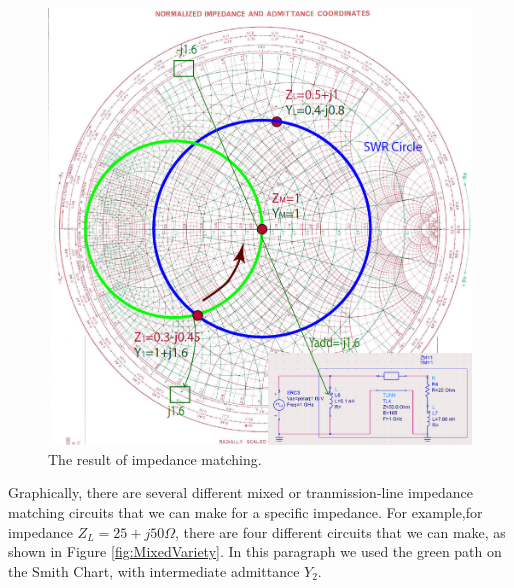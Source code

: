 \documentclass{ximera}
\begin{document}
\begin{figure}[htbp]
\begin{center}
\includegraphics[scale=0.4]{../jpg/MatchMixed1.jpg}
\end{center}
\caption{The result of impedance matching.}
\label{impmatchgen}
\end{figure}
\newpage

Graphically, there are several different mixed or tranmission-line impedance matching circuits that we can make for a specific impedance. For example,for impedance $Z_L=25+j50 \Omega$, there are four different  circuits that we can make, as shown in Figure \ref{fig:MixedVariety}. In this paragraph we used the green path on the Smith Chart, with intermediate admittance $Y_2$. 
\end{document}
